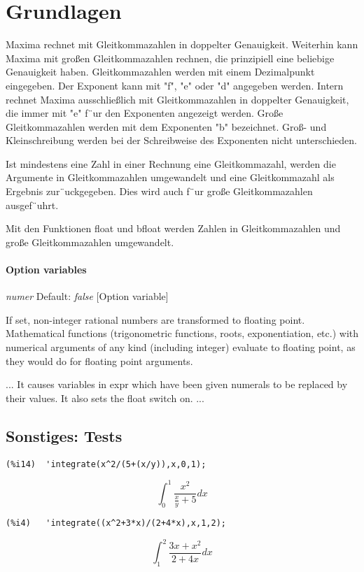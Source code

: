 \documentclass[../Maxima_Book.tex]{subfiles}
\begin{document}
\chapter{Grundlagen}

Maxima rechnet mit Gleitkommazahlen in doppelter Genauigkeit. Weiterhin kann Maxima
mit großen Gleitkommazahlen rechnen, die prinzipiell eine beliebige Genauigkeit haben.
Gleitkommazahlen werden mit einem Dezimalpunkt eingegeben. Der Exponent kann mit
"f", "e" oder "d" angegeben werden. Intern rechnet Maxima ausschließlich mit Gleitkommazahlen
in doppelter Genauigkeit, die immer mit "e" f¨ur den Exponenten angezeigt
werden. Große Gleitkommazahlen werden mit dem Exponenten "b" bezeichnet. Groß- und
Kleinschreibung werden bei der Schreibweise des Exponenten nicht unterschieden.

Ist mindestens eine Zahl in einer Rechnung eine Gleitkommazahl, werden die Argumente
in Gleitkommazahlen umgewandelt und eine Gleitkommazahl als Ergebnis zur¨uckgegeben.
Dies wird auch f¨ur große Gleitkommazahlen ausgef¨uhrt.

Mit den Funktionen float und bfloat werden Zahlen in Gleitkommazahlen und große
Gleitkommazahlen umgewandelt.

\subsubsection{Option variables}

\emph{numer} \qquad Default: \emph{false} \hfill [Option variable]

\lz If set, non-integer rational numbers are transformed to floating point. Mathematical functions (trigonometric functions, roots, exponentiation, etc.) with numerical arguments of any kind (including integer) evaluate to floating point, as they would do for floating point arguments.

... It causes variables in expr which have been given numerals to be replaced by their values. It also sets the float switch on. ...




	
\section{Sonstiges: Tests}

\begin{lstlisting}
(%i14) 	'integrate(x^2/(5+(x/y)),x,0,1);
\end{lstlisting}
\vspace{-4mm} \[\tag{\%o14} 
\int_{0}^{1}{\frac{{{x}^{2}}}{\frac{x}{y}+5}dx} \]

\vspace{-4mm} \begin{lstlisting}
(%i4) 	'integrate((x^2+3*x)/(2+4*x),x,1,2);
\end{lstlisting}
\vspace{-4mm} \[ \tag{\%o4} 
\int_{1}^{2}{\frac{3 x+{{x}^{2}}}{2+4x}dx} \]
\end{document}
